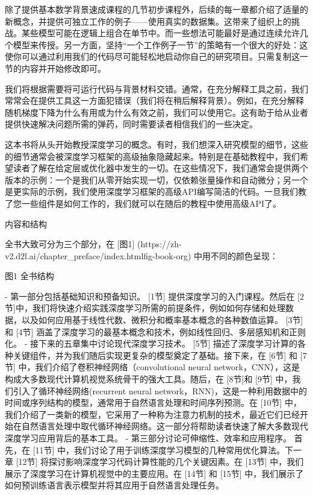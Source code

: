除了提供基本数学背景速成课程的几节初步课程外，后续的每一章都介绍了适量的新概念，并提供可独立工作的例子——使用真实的数据集。这带来了组织上的挑战。某些模型可能在逻辑上组合在单节中。而一些想法可能最好是通过连续允许几个模型来传授。另一方面，坚持“一个工作例子一节”的策略有一个很大的好处：这使你可以通过利用我们的代码尽可能轻松地启动你自己的研究项目。只需复制这一节的内容并开始修改即可。

我们将根据需要将可运行代码与背景材料交错。通常，在充分解释工具之前，我们常常会在提供工具这一方面犯错误（我们将在稍后解释背景）。例如，在充分解释随机梯度下降为什么有用或为什么有效之前，我们可以使用它。这有助于给从业者提供快速解决问题所需的弹药，同时需要读者相信我们的一些决定。

这本书将从头开始教授深度学习的概念。有时，我们想深入研究模型的细节，这些的细节通常会被深度学习框架的高级抽象隐藏起来。特别是在基础教程中，我们希望读者了解在给定层或优化器中发生的一切。在这些情况下，我们通常会提供两个版本的示例：一个是我们从零开始实现一切，仅依赖张量操作和自动微分；另一个是更实际的示例，我们使用深度学习框架的高级API编写简洁的代码。一旦我们教了您一些组件是如何工作的，我们就可以在随后的教程中使用高级API了。

 内容和结构

全书大致可分为三个部分，在 [图1]
(https://zh-v2.d2l.ai/chapter\_preface/index.htmlfig-book-org) 
中用不同的颜色呈现：

图1 全书结构

- 第一部分包括基础知识和预备知识。 [1节]
提供深度学习的入门课程。然后在 [2节]中，我们将快速介绍实践深度学习所需的前提条件，例如如何存储和处理数据，以及如何应用基于线性代数、微积分和概率基本概念的各种数值运算。 [3节]和 [4节]
涵盖了深度学习的最基本概念和技术，例如线性回归、多层感知机和正则化。
- 接下来的五章集中讨论现代深度学习技术。 [5节]
描述了深度学习计算的各种关键组件，并为我们随后实现更复杂的模型奠定了基础。接下来，在 [6节]
和 [7节]
中，我们介绍了卷积神经网络（convolutional neural network，CNN），这是构成大多数现代计算机视觉系统骨干的强大工具。随后，在 [8节]和 [9节]
中，我们引入了循环神经网络(recurrent neural network，RNN)，这是一种利用数据中的时间或序列结构的模型，通常用于自然语言处理和时间序列预测。在 [10节]
中，我们介绍了一类新的模型，它采用了一种称为注意力机制的技术，最近它们已经开始在自然语言处理中取代循环神经网络。这一部分将帮助读者快速了解大多数现代深度学习应用背后的基本工具。
- 第三部分讨论可伸缩性、效率和应用程序。 首先，在 [11节]
中，我们讨论了用于训练深度学习模型的几种常用优化算法。下一章 [12节]
将探讨影响深度学习代码计算性能的几个关键因素。在 [13节]
中，我们展示了深度学习在计算机视觉中的主要应用。在 [14节]
和 [15节] 中，我们展示了如何预训练语言表示模型并将其应用于自然语言处理任务。



